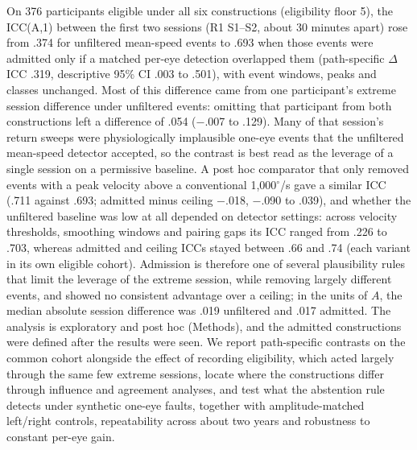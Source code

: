 On 376 participants eligible under all six constructions (eligibility floor 5), the ICC(A,1) between the first two sessions (R1 S1--S2, about 30 minutes apart) rose from .374 for unfiltered mean-speed events to .693 when those events were admitted only if a matched per-eye detection overlapped them (path-specific $\Delta$ICC .319, descriptive 95\% CI .003 to .501), with event windows, peaks and classes unchanged. Most of this difference came from one participant's extreme session difference under unfiltered events: omitting that participant from both constructions left a difference of .054 ($-$.007 to .129). Many of that session's return sweeps were physiologically implausible one-eye events that the unfiltered mean-speed detector accepted, so the contrast is best read as the leverage of a single session on a permissive baseline. A post hoc comparator that only removed events with a peak velocity above a conventional 1,000$^\circ$/s gave a similar ICC (.711 against .693; admitted minus ceiling $-$.018, $-$.090 to .039), and whether the unfiltered baseline was low at all depended on detector settings: across velocity thresholds, smoothing windows and pairing gaps its ICC ranged from .226 to .703, whereas admitted and ceiling ICCs stayed between .66 and .74 (each variant in its own eligible cohort). Admission is therefore one of several plausibility rules that limit the leverage of the extreme session, while removing largely different events, and showed no consistent advantage over a ceiling; in the units of $A$, the median absolute session difference was .019 unfiltered and .017 admitted. The analysis is exploratory and post hoc (Methods), and the admitted constructions were defined after the results were seen. We report path-specific contrasts on the common cohort alongside the effect of recording eligibility, which acted largely through the same few extreme sessions, locate where the constructions differ through influence and agreement analyses, and test what the abstention rule detects under synthetic one-eye faults, together with amplitude-matched left/right controls, repeatability across about two years and robustness to constant per-eye gain.
